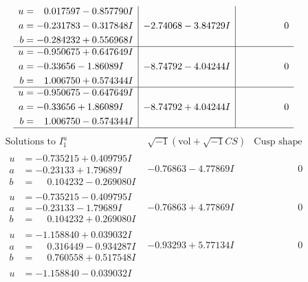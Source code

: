 \documentclass[1p]{elsarticle_modified}
\theoremstyle{definition}
\newcommand{\I}{\sqrt{-1}}
\begin{document}
$$\begin{array}{c|c|c}
\begin{aligned}
u &= \phantom{-}0.017597 - 0.857790 I \\
a &= -0.231783 - 0.317848 I \\
b &= -0.284232 + 0.556968 I\end{aligned}
 & -2.74068 - 3.84729 I & \phantom{-0.000000 } 0 \\ \hline\begin{aligned}
u &= -0.950675 + 0.647649 I \\
a &= -0.33656 - 1.86089 I \\
b &= \phantom{-}1.006750 + 0.574344 I\end{aligned}
 & -8.74792 - 4.04244 I & \phantom{-0.000000 } 0 \\ \hline\begin{aligned}
u &= -0.950675 - 0.647649 I \\
a &= -0.33656 + 1.86089 I \\
b &= \phantom{-}1.006750 - 0.574344 I\end{aligned}
 & -8.74792 + 4.04244 I & \phantom{-0.000000 } 0\\
 \hline 
 \end{array}$$\newpage$$\begin{array}{c|c|c}  
\text{Solutions to }I^u_{1}& \I (\text{vol} + \sqrt{-1}CS) & \text{Cusp shape}\\
 \hline 
\begin{aligned}
u &= -0.735215 + 0.409795 I \\
a &= -0.23133 + 1.79689 I \\
b &= \phantom{-}0.104232 - 0.269080 I\end{aligned}
 & -0.76863 - 4.77869 I & \phantom{-0.000000 } 0 \\ \hline\begin{aligned}
u &= -0.735215 - 0.409795 I \\
a &= -0.23133 - 1.79689 I \\
b &= \phantom{-}0.104232 + 0.269080 I\end{aligned}
 & -0.76863 + 4.77869 I & \phantom{-0.000000 } 0 \\ \hline\begin{aligned}
u &= -1.158840 + 0.039032 I \\
a &= \phantom{-}0.316449 - 0.934287 I \\
b &= \phantom{-}0.760558 + 0.517548 I\end{aligned}
 & -0.93293 + 5.77134 I & \phantom{-0.000000 } 0 \\ \hline\begin{aligned}
u &= -1.158840 - 0.039032 I \\

\end{aligned}
\end{array}$$
\end{document}
